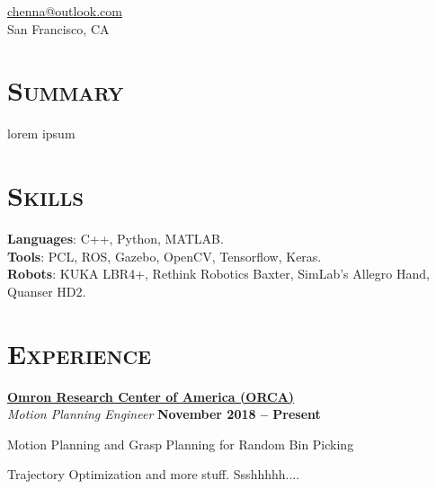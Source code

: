 \documentclass[margin, line]{resume}
\begin{document}
\author{Kautilya Chenna}
{
    \sc
    \hfill \href{mailto:chenna@outlook.com}{chenna@outlook.com}     \vspace{0mm}\\\vspace{0mm}%
    \hfill San Francisco, CA                                        \vspace{0mm}\\\vspace{-10.5mm}%
}

\begin{resume}

    \section{\mysidestyle \textsc{Summary}}
    lorem ipsum



    \sectionline
    \section{\mysidestyle \textsc{Skills}}

    \textbf{Languages}: C++, Python, MATLAB. \\[1mm]
    \textbf{Tools}: PCL, ROS, Gazebo, OpenCV, Tensorflow, Keras. \\[1mm]
    \textbf{Robots}: KUKA LBR4+, Rethink Robotics Baxter, SimLab's Allegro Hand, Quanser HD2.%



    \sectionline
    \section{\mysidestyle \textsc{Experience}}

    \href{https://www.omron.com/global/americas/usa.html}{\textbf{Omron Research Center of America (ORCA)}} \vspace{1pt}\\\vspace{1pt}%
    \textsl{Motion Planning Engineer} \hfill \textbf{November 2018 -- Present}\\ \vspace{-4.5mm}
    \begin{list2}
        \item Motion Planning and Grasp Planning for Random Bin Picking
        \item Trajectory Optimization and more stuff. Ssshhhhh....
    \end{list2}\vspace{-2.25mm}


\end{resume}
\end{document}
